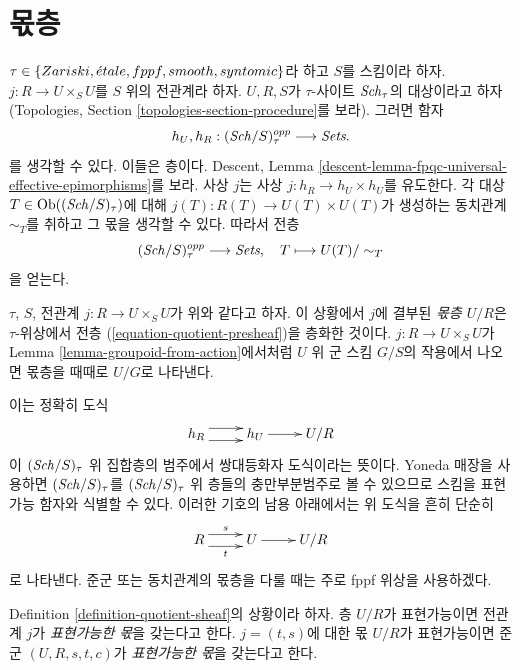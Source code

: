 \section{몫층}
\label{section-quotient-sheaves}

\noindent
$\tau \in \{Zariski, {\acute{e}tale}, fppf, smooth, syntomic\}$라 하고 $S$를 스킴이라 하자. $j : R \to U \times_S U$를
$S$ 위의 전관계라 하자. $U, R, S$가 $\tau$-사이트 $\mathit{Sch}_\tau$의 대상이라고 하자
(Topologies, Section \ref{topologies-section-procedure}를 보라). 그러면 함자
$$
h_U, h_R :
(\mathit{Sch}/S)_\tau^{opp}
\longrightarrow
\textit{Sets}.
$$
를 생각할 수 있다. 이들은 층이다. Descent, Lemma
\ref{descent-lemma-fpqc-universal-effective-epimorphisms}를 보라. 사상 $j$는 사상
$j : h_R \to h_U \times h_U$를 유도한다. 각 대상 $T \in \mathop{\mathrm{Ob}}\nolimits((\mathit{Sch}/S)_\tau)$에 대해
$j(T) : R(T) \to U(T) \times U(T)$가 생성하는 동치관계 $\sim_T$를 취하고 그 몫을 생각할 수 있다.
따라서 전층
\begin{equation}
\label{equation-quotient-presheaf}
(\mathit{Sch}/S)_\tau^{opp}
\longrightarrow
\textit{Sets}, \quad
T \longmapsto U(T)/\sim_T
\end{equation}
을 얻는다.

\begin{definition}
\label{definition-quotient-sheaf}
$\tau$, $S$, 전관계 $j : R \to U \times_S U$가 위와 같다고 하자. 이 상황에서 $j$에 결부된
{\it 몫층 $U/R$}은 $\tau$-위상에서 전층 (\ref{equation-quotient-presheaf})을 층화한 것이다.
$j : R \to U \times_S U$가 Lemma \ref{lemma-groupoid-from-action}에서처럼 $U$ 위 군 스킴 $G/S$의 작용에서
나오면 몫층을 때때로 $U/G$로 나타낸다.
\end{definition}

\noindent
이는 정확히 도식
$$
\xymatrix{
h_R \ar@<1ex>[r] \ar@<-1ex>[r] &
h_U \ar[r] &
U/R
}
$$
이 $(\mathit{Sch}/S)_\tau$ 위 집합층의 범주에서 쌍대등화자 도식이라는 뜻이다. Yoneda 매장을 사용하면
$(\mathit{Sch}/S)_\tau$를 $(\mathit{Sch}/S)_\tau$ 위 층들의 충만부분범주로 볼 수 있으므로 스킴을 표현가능 함자와 식별할 수 있다.
이러한 기호의 남용 아래에서는 위 도식을 흔히 단순히
$$
\xymatrix{
R \ar@<1ex>[r]^s \ar@<-1ex>[r]_t &
U \ar[r] &
U/R
}
$$
로 나타낸다. 준군 또는 동치관계의 몫층을 다룰 때는 주로 fppf 위상을 사용하겠다.

\begin{definition}
\label{definition-representable-quotient}
Definition \ref{definition-quotient-sheaf}의 상황이라 하자. 층 $U/R$가 표현가능이면 전관계 $j$가
{\it 표현가능한 몫}을 갖는다고 한다. $j = (t, s)$에 대한 몫 $U/R$가 표현가능이면 준군
$(U, R, s, t, c)$가 {\it 표현가능한 몫}을 갖는다고 한다.
\end{definition}

